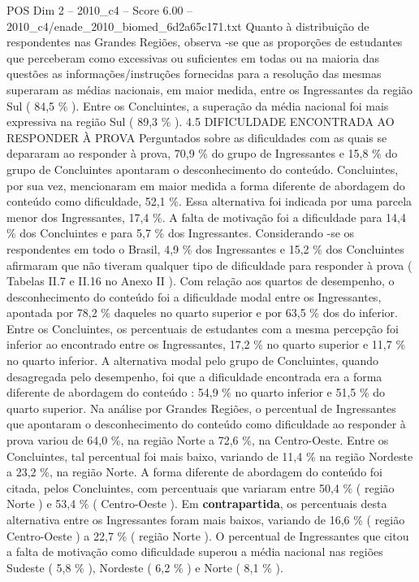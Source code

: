 \begin{textsample}{POS Dim 2 – 2010\_c4 – Score 6.00 – 2010\_c4/enade\_2010\_biomed\_6d2a65c171.txt}
Quanto à distribuição de respondentes nas Grandes Regiões, observa -se que as proporções de estudantes que perceberam como excessivas ou suficientes em todas ou na maioria das questões as informações/instruções fornecidas para a resolução das mesmas superaram as médias nacionais, em maior medida, entre os Ingressantes da região Sul ( 84,5 \% ).
Entre os Concluintes, a superação da média nacional foi mais expressiva na região Sul ( 89,3 \% ). 4.5 DIFICULDADE ENCONTRADA AO RESPONDER À PROVA Perguntados sobre as dificuldades com as quais se depararam ao responder à prova, 70,9 \% do grupo de Ingressantes e 15,8 \% do grupo de Concluintes apontaram o desconhecimento do conteúdo.
Concluintes, por sua vez, mencionaram em maior medida a forma diferente de abordagem do conteúdo como dificuldade, 52,1 \%.
Essa alternativa foi indicada por uma parcela menor dos Ingressantes, 17,4 \%.
A falta de motivação foi a dificuldade para 14,4 \% dos Concluintes e para 5,7 \% dos Ingressantes.
Considerando -se os respondentes em todo o Brasil, 4,9 \% dos Ingressantes e 15,2 \% dos Concluintes afirmaram que não tiveram qualquer tipo de dificuldade para responder à prova ( Tabelas II.7 e II.16 no Anexo II ).
Com relação aos quartos de desempenho, o desconhecimento do conteúdo foi a dificuldade modal entre os Ingressantes, apontada por 78,2 \% daqueles no quarto superior e por 63,5 \% dos do inferior.
Entre os Concluintes, os percentuais de estudantes com a mesma percepção foi inferior ao encontrado entre os Ingressantes, 17,2 \% no quarto superior e 11,7 \% no quarto inferior.
A alternativa modal pelo grupo de Concluintes, quando desagregada pelo desempenho, foi que a dificuldade encontrada era a forma diferente de abordagem do conteúdo : 54,9 \% no quarto inferior e 51,5 \% do quarto superior.
Na análise por Grandes Regiões, o percentual de Ingressantes que apontaram o desconhecimento do conteúdo como dificuldade ao responder à prova variou de 64,0 \%, na região Norte a 72,6 \%, na Centro-Oeste.
Entre os Concluintes, tal percentual foi mais baixo, variando de 11,4 \% na região Nordeste a 23,2 \%, na região Norte.
A forma diferente de abordagem do conteúdo foi citada, pelos Concluintes, com percentuais que variaram entre 50,4 \% ( região Norte ) e 53,4 \% ( Centro-Oeste ).
Em \textbf{contrapartida}, os percentuais desta alternativa entre os Ingressantes foram mais baixos, variando de 16,6 \% ( região Centro-Oeste ) a 22,7 \% ( região Norte ).
O percentual de Ingressantes que citou a falta de motivação como dificuldade superou a média nacional nas regiões Sudeste ( 5,8 \% ), Nordeste ( 6,2 \% ) e Norte ( 8,1 \% ).

\end{textsample}
